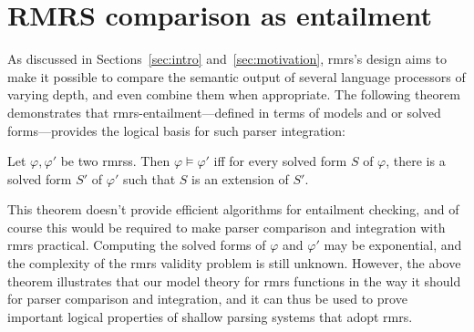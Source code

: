 \section{RMRS comparison as entailment}
\label{sec:entailment}

As discussed in Sections~\ref{sec:intro} and~\ref{sec:motivation}, 
{\sc rmrs}'s design aims to make it possible to compare
the semantic output of several language processors of varying depth,
and even combine them when appropriate.  The following theorem 
demonstrates that {\sc rmrs}-entailment---defined in terms of
models and or solved forms---provides the logical 
basis for such parser integration:

%
\begin{thm}\label{thm:big-one}
  Let $\varphi, \varphi'$ be two {\sc rmrs}s.  Then $\varphi \models
  \varphi'$ iff for every solved form $S$ of $\varphi$, there is a
  solved form $S'$ of $\varphi'$ such that $S$ is an extension of
  $S'$.
\end{thm}

This theorem doesn't provide 
efficient
algorithms for entailment checking, and of course this would be
required to make parser comparison and integration with {\sc rmrs}
practical.  Computing the solved forms of $\varphi$ and $\varphi'$ may
be exponential, and the complexity of the {\sc rmrs} validity problem
is still unknown.  However, the above theorem illustrates that our
model theory for {\sc rmrs} functions in the way it should for parser
comparison and integration, and it can thus be used to prove important
logical properties of shallow parsing systems that adopt {\sc rmrs}.

